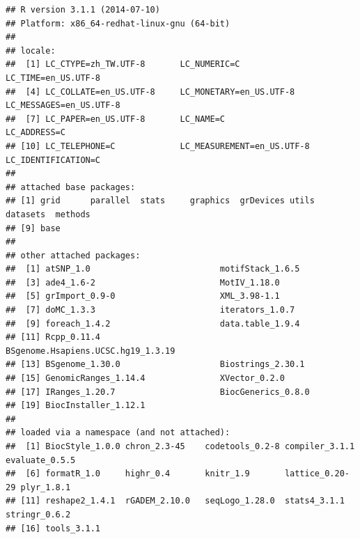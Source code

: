 \documentclass[a4paper,10pt]{article}\usepackage[]{graphicx}\usepackage[]{color}
\makeatletter
\newenvironment{kframe}{%
 \def\at@end@of@kframe{}%
 \ifinner\ifhmode%
  \def\at@end@of@kframe{\end{minipage}}%
  \begin{minipage}{\columnwidth}%
 \fi\fi%
 \def\FrameCommand##1{\hskip\@totalleftmargin \hskip-\fboxsep
 \colorbox{shadecolor}{##1}\hskip-\fboxsep
     \hskip-\linewidth \hskip-\@totalleftmargin \hskip\columnwidth}%
 \MakeFramed {\advance\hsize-\width
   \@totalleftmargin\z@ \linewidth\hsize
   \@setminipage}}%
 {\par\unskip\endMakeFramed%
 \at@end@of@kframe}
\newenvironment{knitrout}{}{} %
\makeatother
\begin{document}
\begin{knitrout}
\color{fgcolor}\begin{kframe}
\begin{verbatim}
## R version 3.1.1 (2014-07-10)
## Platform: x86_64-redhat-linux-gnu (64-bit)
## 
## locale:
##  [1] LC_CTYPE=zh_TW.UTF-8       LC_NUMERIC=C               LC_TIME=en_US.UTF-8       
##  [4] LC_COLLATE=en_US.UTF-8     LC_MONETARY=en_US.UTF-8    LC_MESSAGES=en_US.UTF-8   
##  [7] LC_PAPER=en_US.UTF-8       LC_NAME=C                  LC_ADDRESS=C              
## [10] LC_TELEPHONE=C             LC_MEASUREMENT=en_US.UTF-8 LC_IDENTIFICATION=C       
## 
## attached base packages:
## [1] grid      parallel  stats     graphics  grDevices utils     datasets  methods  
## [9] base     
## 
## other attached packages:
##  [1] atSNP_1.0                          motifStack_1.6.5                  
##  [3] ade4_1.6-2                         MotIV_1.18.0                      
##  [5] grImport_0.9-0                     XML_3.98-1.1                      
##  [7] doMC_1.3.3                         iterators_1.0.7                   
##  [9] foreach_1.4.2                      data.table_1.9.4                  
## [11] Rcpp_0.11.4                        BSgenome.Hsapiens.UCSC.hg19_1.3.19
## [13] BSgenome_1.30.0                    Biostrings_2.30.1                 
## [15] GenomicRanges_1.14.4               XVector_0.2.0                     
## [17] IRanges_1.20.7                     BiocGenerics_0.8.0                
## [19] BiocInstaller_1.12.1              
## 
## loaded via a namespace (and not attached):
##  [1] BiocStyle_1.0.0 chron_2.3-45    codetools_0.2-8 compiler_3.1.1  evaluate_0.5.5 
##  [6] formatR_1.0     highr_0.4       knitr_1.9       lattice_0.20-29 plyr_1.8.1     
## [11] reshape2_1.4.1  rGADEM_2.10.0   seqLogo_1.28.0  stats4_3.1.1    stringr_0.6.2  
## [16] tools_3.1.1
\end{verbatim}
\end{kframe}
\end{knitrout}


%
%



\end{document}
